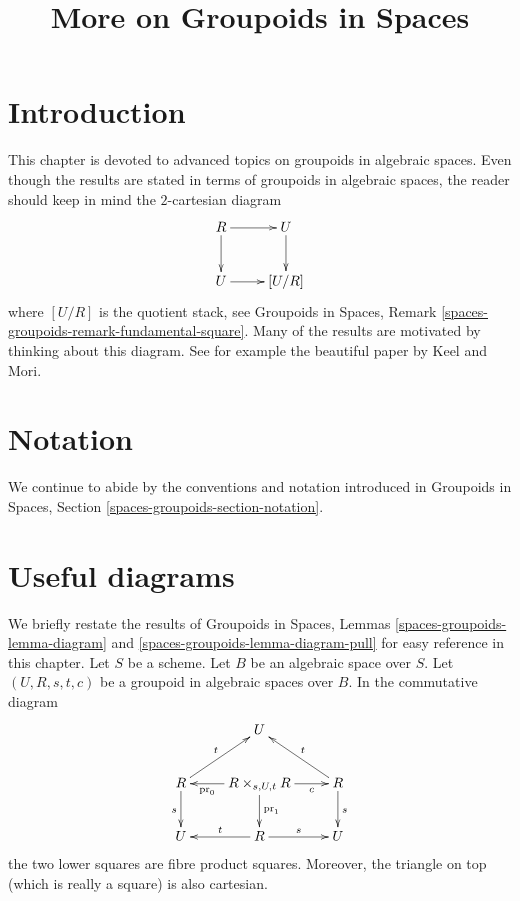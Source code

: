 

%


\title{More on Groupoids in Spaces}


\maketitle

\label{section-phantom}

\tableofcontents

\section{Introduction}
\label{section-introduction}

\noindent
This chapter is devoted to advanced topics on groupoids
in algebraic spaces.
Even though the results are stated in terms of groupoids in
algebraic spaces, the
reader should keep in mind the $2$-cartesian diagram
\begin{equation}
\label{equation-quotient-stack}
\vcenter{
\xymatrix{
R \ar[r] \ar[d] & U \ar[d] \\
U \ar[r] & [U/R]
}
}
\end{equation}
where $[U/R]$ is the quotient stack, see
Groupoids in Spaces, Remark \ref{spaces-groupoids-remark-fundamental-square}.
Many of the results are motivated by thinking about this diagram.
See for example the beautiful paper \cite{K-M} by Keel and Mori.





\section{Notation}
\label{section-notation}

\noindent
We continue to abide by the conventions and notation introduced in
Groupoids in Spaces, Section \ref{spaces-groupoids-section-notation}.





\section{Useful diagrams}
\label{section-diagrams}

\noindent
We briefly restate the results of
Groupoids in Spaces, Lemmas \ref{spaces-groupoids-lemma-diagram} and
\ref{spaces-groupoids-lemma-diagram-pull}
for easy reference in this chapter.
Let $S$ be a scheme. Let $B$ be an algebraic space over $S$.
Let $(U, R, s, t, c)$ be a groupoid in algebraic spaces over $B$.
In the commutative diagram
\begin{equation}
\label{equation-diagram}
\vcenter{
\xymatrix{
& U & \\
R \ar[d]_s \ar[ru]^t &
R \times_{s, U, t} R
\ar[l]^-{\text{pr}_0} \ar[d]^{\text{pr}_1} \ar[r]_-c &
R \ar[d]^s \ar[lu]_t \\
U & R \ar[l]_t \ar[r]^s & U
}
}
\end{equation}
the two lower squares are fibre product squares.
Moreover, the triangle on top (which is really a square)
is also cartesian.

